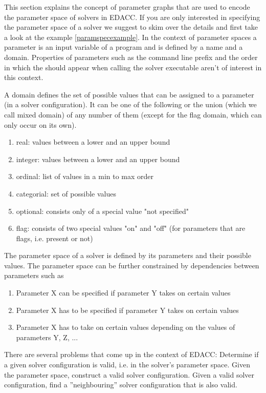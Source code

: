 This section explains the concept of parameter graphs that are used to encode
the parameter space of solvers in EDACC. If you are only interested in specifying the parameter space
of a solver we suggest to skim over the details and first take a look at the example \ref{paramspecexample}.
In the context of parameter spaces a parameter is an input variable of a program and is defined by a name and a domain.
Properties of parameters such as the command line prefix and the order in which the should appear when calling the solver executable
aren't of interest in this context.

\begin{definition}
A domain defines the set of possible values that can be assigned to a parameter (in a solver configuration). It can be one of the following or the union (which we call mixed domain) of any number of them (except for the flag domain, which can only occur on its own).
\begin{enumerate}
\item real: values between a lower and an upper bound
\item integer: values between a lower and an upper bound
\item ordinal: list of values in a min to max order
\item categorial: set of possible values
\item optional: consists only of a special value "not specified"
\item flag: consists of two special values "on" and "off" (for parameters that are flags, i.e. present or not)
\end{enumerate}
\end{definition}

\begin{definition}
The parameter space of a solver is defined by its parameters and their possible values. The parameter space can be further constrained by
dependencies between parameters such as
\begin{enumerate}
\item Parameter X can be specified if parameter Y takes on certain values
\item Parameter X has to be specified if parameter Y takes on certain values
\item Parameter X has to take on certain values depending on the values of parameters Y, Z, ...
\end{enumerate}
\end{definition}

There are several problems that come up in the context of EDACC: Determine if a given solver configuration is valid, i.e. in the solver's parameter space.
Given the parameter space, construct a valid solver configuration. Given a valid solver configuration, find a ''neighbouring'' solver configuration that is also valid.

